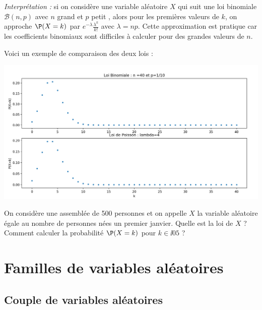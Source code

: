 \documentclass[french,11pt,twoside]{VcCours}
\begin{document}
\medskip

\emph{Interprétation :} si on considère une variable aléatoire $X$ qui suit une loi binomiale $\mathcal B(n,p)$ avec $n$ \og grand \fg et $p$ \og petit \fg, alors pour les premières valeurs de $k$, on approche $\P(X=k)$ par $e^{-\lambda} \frac{\lambda^k}{k !}$ avec $\lambda = np$. Cette approximation est pratique car les coefficients binomiaux sont difficiles à calculer pour des grandes valeurs de $n$.

\medskip

\begin{Demonstration}{}
\vspace{6cm}
\end{Demonstration}

\newpage
Voici un exemple de comparaison des deux lois :


\begin{center}
\includegraphics[scale=0.4]{Poisson}
\end{center}

\begin{Exemple}{}
On considère une assemblée de 500 personnes et on appelle $X$ la variable aléatoire égale au nombre de personnes nées un premier janvier. Quelle est la loi de $X$ ? Comment calculer la probabilité $\P(X=k)$ pour $k\in \ii 0 5$ ?

\vspace{4cm}
\end{Exemple}

\section{Familles de variables aléatoires}
\subsection{Couple de variables aléatoires}
\end{document}
